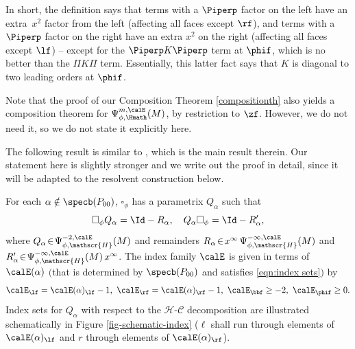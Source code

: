 In short, the definition says that terms with a $\Piperp$ factor on the left have an extra~$x^2$ factor from the left (affecting all faces except $\rf$), and terms with a $\Piperp$ factor on the right have an extra $x^2$ on the right (affecting all faces except $\lf$) -- except for the $\Piperp K\Piperp$ term at $\phif$, which is no better than the $\Pi K\Pi$ term.
Essentially, this latter fact says that $K$ is diagonal to two leading orders at $\phif$.

Note that the proof of our Composition Theorem \ref{compositionth} also yields a composition theorem for $\Psi^{m,\calE}_{\phi,\Hmath}(M)$, by restriction to $\zf$. However, we do not need it, so we do not state it explicitly here.

The following result is similar to \cite[Th.\,12]{grieser-para}, which is the main result therein.
Our statement here is slightly stronger
and we write out the proof in detail, since it will be adapted
to the resolvent construction below.

\begin{Th}\label{thm:split phi-parametrix}
For each $\alpha \notin \specb(P_{00})$, $\square_\phi$ has a parametrix $Q_\alpha$ such that
\[
\square_\phi Q_\alpha = \Id - R_\alpha,\quad Q_\alpha\square_\phi = \Id - R'_\alpha,
\]
where $Q_\alpha\!\in\! \Psi^{-2,\calE}_{\phi, \mathscr{H}}(M)$ and remainders
$R_\alpha\!\in\! x^\infty\,\Psi^{-\infty,\calE}_{\phi, \mathscr{H}}(M)$ and $R'_\alpha\!\in\!\Psi^{-\infty,\calE}_{\phi, \mathscr{H}}(M)\,x^\infty$.
The index family $\calE$ is given in terms of $\calE(\alpha)$ $($that is determined by $\specb(P_{00})$
and satisfies \eqref{eqn:index sets}$)$ by
\[
\calE_{\lf}=\calE(\alpha)_\lf-1, \ \calE_\rf=\calE(\alpha)_\rf-1, \ \calE_\bbf\geq-2, \ \calE_{\phif}\geq 0.
\]
Index sets for $Q_\alpha$ with respect to the $\mathscr{H}$-$\mathscr{C}$ decomposition
are illustrated schematically in Figure \ref{fig-schematic-index} ($\ell$ shall run through elements of
$\calE(\alpha)_\lf$ and $r$ through elements of $\calE(\alpha)_\rf$).
\end{Th}

